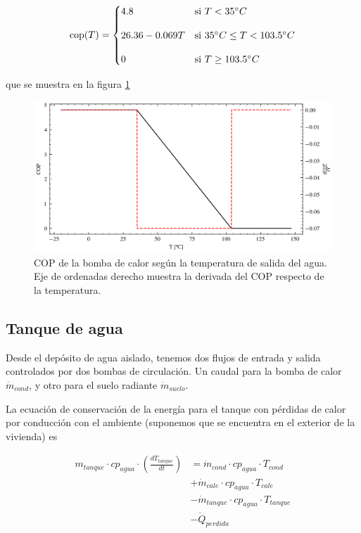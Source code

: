 \begin{equation}
	\text{\text{cop}}(T) =
	\begin{cases}
		4.8              & \text{si } T < 35^\circ C                    \\[10pt]
		26.36 - 0.069 T & \text{si } 35^\circ C \leq T < 103.5^\circ C \\[10pt]
		0                & \text{si } T \geq 103.5^\circ C
	\end{cases}
\end{equation}

que se muestra en la figura \ref{fig:heat_pump_cop}

\begin{figure}[h] \centering
	\centering
	\includegraphics[width=1\textwidth]{./capitulos/resultados_discusion/images/heat_pump_cop.png}
	\caption{COP de la bomba de calor según la temperatura de salida del agua.
		Eje de ordenadas derecho muestra la derivada del COP respecto de la
		temperatura.}
	\label{fig:heat_pump_cop}
\end{figure}


\subsection{Tanque de agua}

Desde el depósito de agua aislado, tenemos dos flujos de entrada y salida
controlados por dos bombas de circulación. Un caudal para la bomba de calor
$\dot{m}_{cond}$, y otro para el suelo radiante $\dot{m}_{suelo}$.

La ecuación de conservación de la energía para el tanque con pérdidas de calor
por conducción con el ambiente (suponemos que se encuentra en el exterior de la
vivienda) es

\begin{align} \label{eq:t_tanque_balance}
	m_{tanque} \cdot cp_{agua} \cdot \left( \frac{dT_{tanque}}{dt} \right) & = \dot{m}_{cond} \cdot cp_{agua} \cdot T_{cond} \nonumber     \\
	                                                                       & + \dot{m}_{cale} \cdot cp_{agua} \cdot T_{cale} \nonumber     \\
	                                                                       & - \dot{m}_{tanque} \cdot cp_{agua} \cdot T_{tanque} \nonumber \\
	                                                                       & - \dot{Q}_{perdida}
\end{align}

